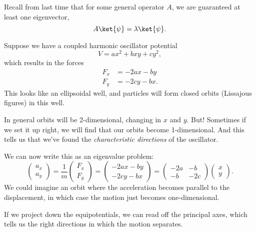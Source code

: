 Recall from last time that for some general operator $A$, we are guaranteed at least one eigenvector,
\begin{equation}
    A\ket{\psi} = \lambda\ket{\psi}.
\end{equation}

Suppose we have a coupled harmonic oscillator potential
\begin{equation}
    V=ax^2 + bxy + cy^2,
\end{equation}
which results in the forces
\begin{align}
    F_x &= -2ax - by\\
    F_y &= -2cy - bx.
\end{align}
This looks like an ellipsoidal well, and particles will form closed orbits (Lissajous figures) in this well.

In general orbits will be 2-dimensional, changing in $x$ and $y$. But! Sometimes if we set it up right, we will find that our orbits become 1-dimensional. And this tells us that we've found the \emph{characteristic directions} of the oscillator.

We can now write this as an eigenvalue problem:
\begin{equation}
    \begin{pmatrix}
        a_x\\ a_y
    \end{pmatrix}
    =\frac{1}{m} \begin{pmatrix}
    F_x \\ F_y
    \end{pmatrix}
    = \begin{pmatrix}
        -2ax - by\\
        -2cy - bx
    \end{pmatrix}
    = \begin{pmatrix}
        -2a & -b\\
        -b & -2c
    \end{pmatrix}
    \begin{pmatrix}
        x\\ y
    \end{pmatrix}.
\end{equation}
We could imagine an orbit where the acceleration becomes parallel to the displacement, in which case the motion just becomes one-dimensional.

If we project down the equipotentials, we can read off the principal axes, which tells us the right directions in which the motion separates.

